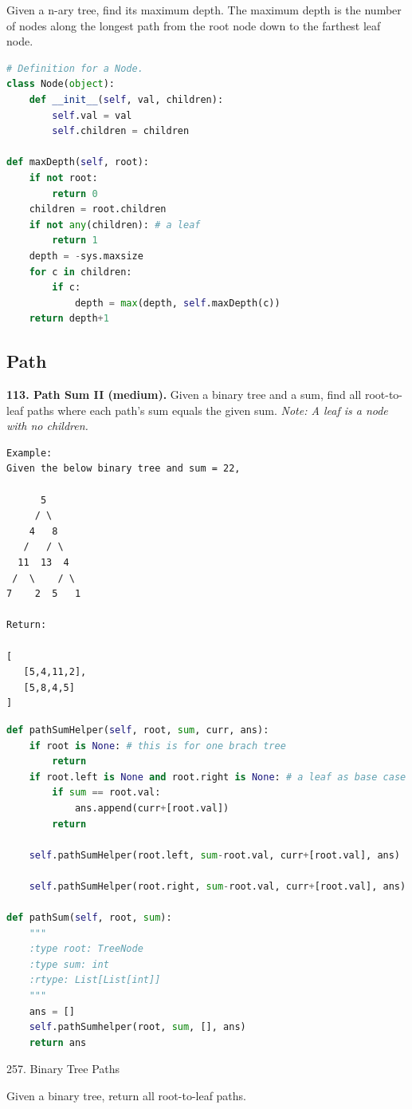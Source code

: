\documentclass[../main.tex]{subfiles}
\begin{document}
Given a n-ary tree, find its maximum depth. The maximum depth is the number of nodes along the longest path from the root node down to the farthest leaf node.
\begin{lstlisting}[language=Python]
# Definition for a Node.
class Node(object):
    def __init__(self, val, children):
        self.val = val
        self.children = children

def maxDepth(self, root):
    if not root:
        return 0
    children = root.children
    if not any(children): # a leaf
        return 1
    depth = -sys.maxsize
    for c in children:
        if c:
            depth = max(depth, self.maxDepth(c))
    return depth+1
\end{lstlisting}
\subsection{Path}
\textbf{113. Path Sum II (medium).} Given a binary tree and a sum, find all root-to-leaf paths where each path's sum equals the given sum.
\textit{Note: A leaf is a node with no children.}
\begin{lstlisting}[numbers=none]
Example:
Given the below binary tree and sum = 22,

      5
     / \
    4   8
   /   / \
  11  13  4
 /  \    / \
7    2  5   1

Return:

[
   [5,4,11,2],
   [5,8,4,5]
]
\end{lstlisting}
\begin{lstlisting}[language=Python]
def pathSumHelper(self, root, sum, curr, ans):
    if root is None: # this is for one brach tree
        return 
    if root.left is None and root.right is None: # a leaf as base case
        if sum == root.val:
            ans.append(curr+[root.val])
        return

    self.pathSumHelper(root.left, sum-root.val, curr+[root.val], ans)

    self.pathSumHelper(root.right, sum-root.val, curr+[root.val], ans)

def pathSum(self, root, sum):
    """
    :type root: TreeNode
    :type sum: int
    :rtype: List[List[int]]
    """
    ans = []
    self.pathSumhelper(root, sum, [], ans)
    return ans
\end{lstlisting}

257. Binary Tree Paths

Given a binary tree, return all root-to-leaf paths.
\end{document}
